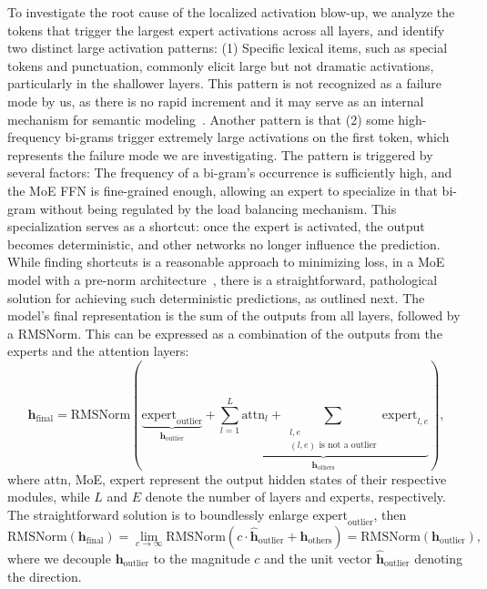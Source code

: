 To investigate the root cause of the localized activation blow-up, we analyze the tokens that trigger the largest expert activations across all layers, and identify two distinct large activation patterns: (1) Specific lexical items, such as special tokens and punctuation, commonly elicit large but not dramatic activations, particularly in the shallower layers. This pattern is not recognized as a failure mode by us, as there is no rapid increment and it may serve as an internal mechanism for semantic modeling~\cite{sun2024massive,an2025systematic}. Another pattern is that (2) some high-frequency bi-grams trigger extremely large activations on the first token, which represents the failure mode we are investigating. The pattern is triggered by several factors:
The frequency of a bi-gram's occurrence is sufficiently high, and the MoE FFN is fine-grained enough, allowing an expert to specialize in that bi-gram without being regulated by the load balancing mechanism. This specialization serves as a shortcut: once the expert is activated, the output becomes deterministic, and other networks no longer influence the prediction. While finding shortcuts is a reasonable approach to minimizing loss, in a MoE model with a pre-norm architecture~\cite{radford2019language,xiong2020layer}, there is a straightforward, pathological solution for achieving such deterministic predictions, as outlined next. The model's final representation is the sum of the outputs from all layers, followed by a RMSNorm. This can be expressed as a combination of the outputs from the experts and the attention layers:
\begin{equation}
\boldsymbol{h}_{\text{final}} = \text{RMSNorm}(\underbrace{\text{expert}_{\text{outlier}}}_{\boldsymbol{h}_{\text{outlier}}} + \underbrace{\sum_{l=1}^L \text{attn}_l + \sum_{\substack{l,e\\(l,e)\text{ is not a outlier}}} \text{expert}_{l,e}}_{\boldsymbol{h}_{\text{others}}}),
\end{equation}
where attn, MoE, expert represent the output hidden states of their respective modules, while \(L\) and \(E\) denote the number of layers and experts, respectively. The straightforward solution is to boundlessly enlarge $\text{expert}_{\text{outlier}}$, then
\begin{equation}
\text{RMSNorm}(\boldsymbol{h}_{\text{final}}) = \lim_{c\rightarrow \infty}\text{RMSNorm}(c \cdot \hat{\boldsymbol{h}}_\text{outlier} + \boldsymbol{h}_{\text{others}}) = \text{RMSNorm}(\boldsymbol{h}_\text{outlier}),
\end{equation}
where we decouple $\boldsymbol{h}_\text{outlier}$ to the magnitude $c$ and the unit vector $\hat{\boldsymbol{h}}_\text{outlier}$ denoting the direction.

